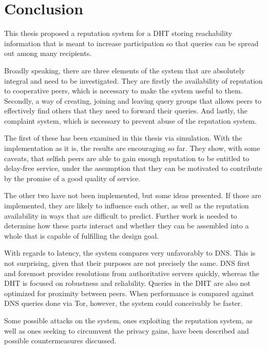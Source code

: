 \chapter{Conclusion}
\label{chap:conclusion}
This thesis proposed a reputation system for a DHT storing reachability
information that is meant to increase participation so that queries can be
spread out among many recipients.

Broadly speaking, there are three elements of the system that are absolutely
integral and need to be investigated. They are firstly the availability of
reputation to cooperative peers, which is necessary to make the system useful to
them. Secondly, a way of creating, joining and leaving query groups that allows
peers to effectively find others that they need to forward their queries. And
lastly, the complaint system, which is necessary to prevent abuse of the
reputation system.

The first of these has been examined in this thesis via simulation. With the
implementation as it is, the results are encouraging so far. They show, with
some caveats, that selfish peers are able to gain enough reputation to be
entitled to delay-free service, under the assumption that they can be motivated
to contribute by the promise of a good quality of service.

The other two have not been implemented, but some ideas presented. If those are
implemented, they are likely to influence each other, as well as the reputation
availability in ways that are difficult to predict. Further work is needed to
determine how these parts interact and whether they can be assembled into a
whole that is capable of fulfilling the design goal.

With regards to latency, the system compares very unfavorably to DNS. This is
not surprising, given that their purposes are not precisely the same. DNS first
and foremost provides resolutions from authoritative servers quickly, whereas
the DHT is focused on robustness and reliability. Queries in the DHT are also
not optimized for proximity between peers. When performance is compared against
DNS queries done via Tor, however, the system could conceivably be faster.

Some possible attacks on the system, ones exploiting the reputation system, as
well as ones seeking to circumvent the privacy gains, have been described and
possible countermeasures discussed.
